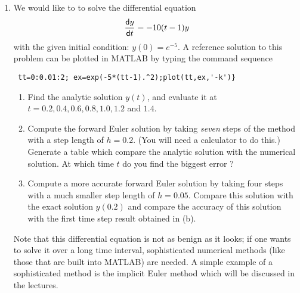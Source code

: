 \documentclass[11pt,a4paper]{article}
\newcommand{\dif}{\mathsf{d}}
\begin{document}
\begin{enumerate}
 \item \label{qdjsode1}
 We would like to  to solve the differential equation
$$
{\dif y\over \dif t} = -10(t-1)y
$$
with the given  initial condition:
$y(0)=e^{-5}$. 
{A reference  solution to this problem can  be
plotted in MATLAB  by  typing the command sequence}  
\begin{verbatim} tt=0:0.01:2; ex=exp(-5*(tt-1).^2);plot(tt,ex,'-k')}
\end{verbatim}
\begin{enumerate}
\item 
Find the analytic solution $y(t)$, and evaluate it at\\
$t=0.2,0.4, 0.6, 0.8, 1.0, 1.2$ and  $1.4$.


\item
Compute the forward Euler solution by  taking {\it seven} steps of the method
with a step length of $h=0.2$. (You will need a calculator to do this.)
Generate a table which
compare the analytic solution with the numerical solution. At which
time $t$ do you find the biggest error ?

\item
Compute a more accurate  forward Euler solution  by  taking  four steps with
a  much smaller step length of $h=0.05$. Compare this solution
with the exact solution  $y(0.2)$ and compare the accuracy of this  solution
with the first time step result  obtained in (b).
\end{enumerate}

Note that  this differential equation  is not as benign as
it looks; if one wants to solve it over a long time interval,
sophisticated numerical methods (like those that are built into MATLAB)
 are needed. A simple example of a sophisticated method is
 the implicit Euler method which will be discussed in the lectures. 
\end{enumerate}
\end{document}
